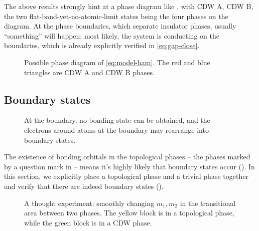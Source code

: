 \documentclass[hyperref, a4paper]{article}
\begin{document}
The above results strongly hint at a phase diagram like ,
with CDW A, CDW B, the two flat-band-yet-no-atomic-limit states 
being the four phases on the diagram.
At the phase boundaries, 
which separate insulator phases,
usually ``something'' will happen: 
most likely, the system is conducting on the boundaries,
which is already explicitly verified in \eqref{eq:gap-close}.

\begin{figure}
    \centering
    
    \caption{Possible phase diagram of \eqref{eq:model-ham}. The red and blue triangles are CDW A and CDW B phases.}
    \label{fig:possible-phase-1}
\end{figure}

\subsection{Boundary states}

\begin{figure}
    \centering
    
    \caption{At the boundary, no bonding state can be obtained, 
    and the electrons around atoms at the boundary 
    may rearrange into boundary states.}
    \label{fig:bonding-half-boundary}
\end{figure}

The existence of bonding orbitals in the topological phases
-- the phases marked by a question mark in  -- means 
it's highly likely that boundary states occur ().
In this section, 
we explicitly place a topological phase and a trivial phase together
and verify that there are indeed boundary states
().

\begin{figure}
    \centering
    
    \caption{A thought experiment: 
    smoothly changing $m_1, m_2$ in the transitional area between 
    two phases.
    The yellow block is in a topological phase, 
    while the green block is in a CDW phase.}
    \label{fig:change-parameter-boundary}
\end{figure}
\end{document}
